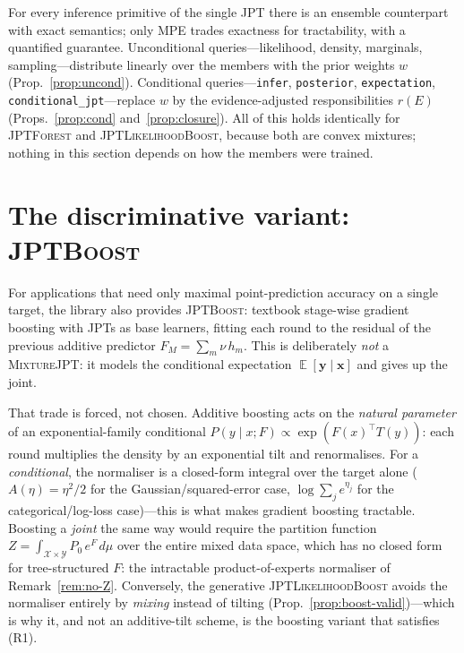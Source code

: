 \documentclass[11pt]{article}
\theoremstyle{plain}
\theoremstyle{definition}
\theoremstyle{remark}
\DeclareMathOperator{\E}{\mathbb{E}}
\newcommand{\X}{\mathcal{X}}
\newcommand{\Y}{\mathcal{Y}}
\newcommand{\jptforest}{\textsc{JPTForest}}
\newcommand{\likeboost}{\textsc{JPTLikelihoodBoost}}
\newcommand{\jptboost}{\textsc{JPTBoost}}
\newcommand{\mixture}{\textsc{MixtureJPT}}
\begin{document}
For every inference primitive of the single JPT there is an ensemble
counterpart with exact semantics; only MPE trades exactness for
tractability, with a quantified guarantee. Unconditional
queries---likelihood, density, marginals, sampling---distribute linearly
over the members with the prior weights $w$
(Prop.~\ref{prop:uncond}). Conditional queries---\texttt{infer},
\texttt{posterior}, \texttt{expectation},
\texttt{conditional\_jpt}---replace $w$ by the evidence-adjusted
responsibilities $r(E)$ (Props.~\ref{prop:cond} and~\ref{prop:closure}).
All of this holds identically for \jptforest{} and \likeboost{}, because
both are convex mixtures; nothing in this section depends on how the
members were trained.

\section{The discriminative variant: \jptboost}
\label{sec:gbm}

For applications that need only maximal point-prediction accuracy on a
single target, the library also provides \jptboost{}: textbook stage-wise
gradient boosting \citep{friedman2001gbm,mason2000boosting} with JPTs as
base learners, fitting each round to the residual of the previous
additive predictor $F_M=\sum_m \nu\,h_m$. This is deliberately \emph{not}
a \mixture{}: it models the conditional expectation
$\E[\mathbf{y}\mid\mathbf{x}]$ and gives up the joint.

That trade is forced, not chosen. Additive boosting acts on the
\emph{natural parameter} of an exponential-family conditional
$P(y\mid x;F)\propto\exp(F(x)^\top T(y))$: each round multiplies the
density by an exponential tilt and renormalises. For a
\emph{conditional}, the normaliser is a closed-form integral over the
target alone ($A(\eta)=\eta^2/2$ for the Gaussian/squared-error case,
$\log\sum_j e^{\eta_j}$ for the categorical/log-loss case)---this is what
makes gradient boosting tractable. Boosting a \emph{joint} the same way
would require the partition function
$Z=\int_{\X\times\Y}P_0\,e^{F}\,d\mu$ over the entire mixed data space,
which has no closed form for tree-structured $F$: the intractable
product-of-experts normaliser of Remark~\ref{rem:no-Z}. Conversely, the
generative \likeboost{} avoids the normaliser entirely by \emph{mixing}
instead of tilting (Prop.~\ref{prop:boost-valid})---which is why it, and
not an additive-tilt scheme, is the boosting variant that satisfies (R1).
\end{document}
